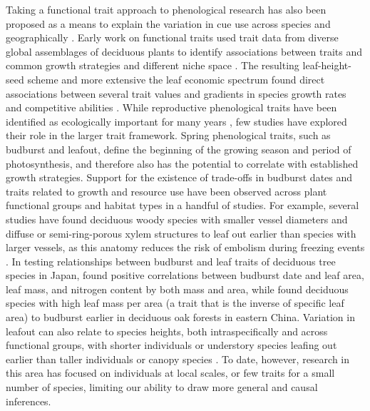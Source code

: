 \documentclass{article}\usepackage[]{graphicx}\usepackage[]{color}
\begin{document}
Taking a functional trait approach to phenological research has also been proposed as a means to explain the variation in cue use across species and geographically \citep{Flynn2018,Osada2017}. Early work on functional traits used trait data from diverse global assemblages of deciduous plants to identify associations between traits and common growth strategies and different niche space \citep{Westoby1998,Wright2004,Chave2009}. The resulting leaf-height-seed scheme and more extensive the leaf economic spectrum found direct associations between several trait values and gradients in species growth rates and competitive abilities \citep{Westoby1998,Wright2004,Diaz2016,Chave2009,Funk2016}. While reproductive phenological traits have been identified as ecologically important for many years \citep{Weiher1999, Laughlin2014}, few studies have explored their role in the larger trait framework. Spring phenological traits, such as budburst and leafout, define the beginning of the growing season and period of photosynthesis, and therefore also has the potential to correlate with established growth strategies. Support for the existence of trade-offs in budburst dates and traits related to growth and resource use have been observed across plant functional groups and habitat types in a handful of studies. For example, several studies have found deciduous woody species with smaller vessel diameters and diffuse or semi-ring-porous xylem structures to leaf out earlier than species with larger vessels, as this anatomy reduces the risk of embolism during freezing events  \citep{Panchen2014, Lechowicz1984}. In testing relationships between budburst and leaf traits of deciduous tree species in Japan, \citep{Osada2017} found positive correlations between budburst date and leaf area, leaf mass, and nitrogen content by both mass and area, while \citep{Sun2006} found deciduous species with high leaf mass per area (a trait that is the inverse of specific leaf area) to budburst earlier in deciduous oak forests in eastern China. %
Variation in leafout can also relate to species heights, both intraspecifically and across functional groups, with shorter individuals or understory species leafing out earlier than taller individuals or canopy species \citep{Seiwa1998, 1999b}. To date, however, research in this area has focused on individuals at local scales, or few traits for a small number of species, limiting our ability to draw more general and causal inferences. 

\end{document}

